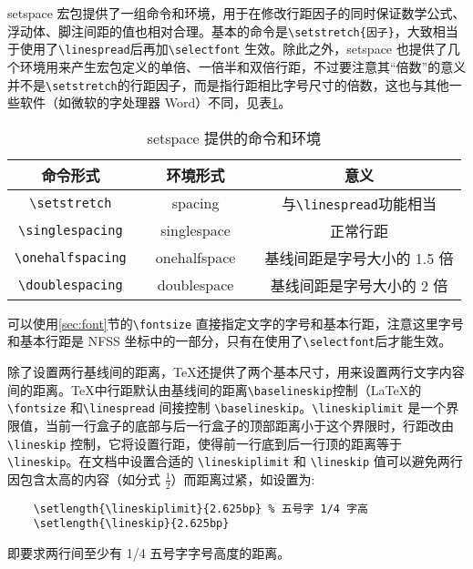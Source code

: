 setspace 宏包提供了一组命令和环境，用于在修改行距因子的同时保证数学公式、浮动体、脚注间距的值也相对合理。基本的命令是\verb|\setstretch{因子}|，大致相当于使用了\verb|\linespread|后再加\verb|\selectfont| 生效。除此之外，setspace 也提供了几个环境用来产生宏包定义的单倍、一倍半和双倍行距，不过要注意其“倍数”的意义并不是\verb|\setstretch|的行距因子，而是指行距相比字号尺寸的倍数，这也与其他一些软件（如微软的字处理器 Word）不同，见表\ref{tab:setspace}。

\begin{table}[h]
    \centering
    \caption{setspace 提供的命令和环境}
    \label{tab:setspace}
    \linespread{1.4}
    \selectfont
    \begin{tabular}{ccccc}
        \toprule
        命令形式 && 环境形式 && 意义 \\
        \midrule 
        \verb|\setstretch| && spacing && 与\verb|\linespread|功能相当 \\ 
        \verb|\singlespacing| &&  singlespace && 正常行距 \\
        \verb|\onehalfspacing| && onehalfspace && 基线间距是字号大小的 1.5 倍 \\
        \verb|\doublespacing| && doublespace && 基线间距是字号大小的 2 倍 \\
        \bottomrule
    \end{tabular}
\end{table}

可以使用\ref{sec:font}节的\verb|\fontsize| 直接指定文字的字号和基本行距，注意这里字号和基本行距是 NFSS 坐标中的一部分，只有在使用了\verb|\selectfont|后才能生效。

除了设置两行基线间的距离，\TeX 还提供了两个基本尺寸，用来设置两行文字内容间的距离。\TeX 中行距默认由基线间的距离\verb|\baselineskip|控制（\LaTeX 的 \verb|\fontsize| 和\verb|\linespread| 间接控制 \verb|\baselineskip|。\verb|\lineskiplimit| 是一个界限值，当前一行盒子的底部与后一行盒子的顶部距离小于这个界限时，行距改由 
\verb|\lineskip| 控制，它将设置行距，使得前一行底到后一行顶的距离等于\verb|\lineskip|。在文档中设置合适的 
\verb|\lineskiplimit| 和 \verb|\lineskip| 值可以避免两行因包含太高的内容（如分式 $\displaystyle \frac{1}{2}$）而距离过紧，如设置为:

\begin{lstlisting}
    \setlength{\lineskiplimit}{2.625bp} % 五号字 1/4 字高
    \setlength{\lineskip}{2.625bp}
\end{lstlisting}

即要求两行间至少有 1/4 五号字字号高度的距离。